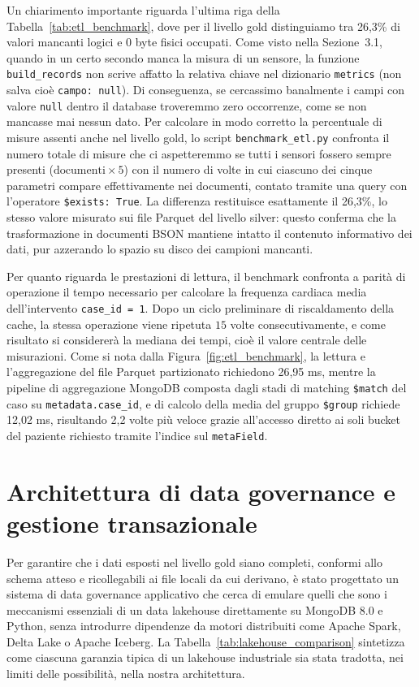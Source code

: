 Un chiarimento importante riguarda l'ultima riga della Tabella~\ref{tab:etl_benchmark}, dove per il livello gold distinguiamo tra 26,3\% di valori mancanti logici e 0 byte fisici occupati. Come visto nella Sezione~3.1, quando in un certo secondo manca la misura di un sensore, la funzione \texttt{build\_records} non scrive affatto la relativa chiave nel dizionario \texttt{metrics} (non salva cio\`e \texttt{campo: null}). Di conseguenza, se cercassimo banalmente i campi con valore \texttt{null} dentro il database troveremmo zero occorrenze, come se non mancasse mai nessun dato. Per calcolare in modo corretto la percentuale di misure assenti anche nel livello gold, lo script \texttt{benchmark\_etl.py} confronta il numero totale di misure che ci aspetteremmo se tutti i sensori fossero sempre presenti ($\text{documenti} \times 5$) con il numero di volte in cui ciascuno dei cinque parametri compare effettivamente nei documenti, contato tramite una query con l'operatore \texttt{\$exists: True}. La differenza restituisce esattamente il 26,3\%, lo stesso valore misurato sui file Parquet del livello silver: questo conferma che la trasformazione in documenti BSON mantiene intatto il contenuto informativo dei dati, pur azzerando lo spazio su disco dei campioni mancanti.

Per quanto riguarda le prestazioni di lettura, il benchmark confronta a parit\`a di operazione il tempo necessario per calcolare la frequenza cardiaca media dell'intervento \texttt{case\_id = 1}. Dopo un ciclo preliminare di riscaldamento della cache, la stessa operazione viene ripetuta $15$ volte consecutivamente, e come risultato si considerer\`a la mediana dei tempi, cio\`e il valore centrale delle misurazioni. Come si nota dalla Figura~\ref{fig:etl_benchmark}, la lettura e l'aggregazione del file Parquet partizionato richiedono 26,95 ms, mentre la pipeline di aggregazione MongoDB composta dagli stadi di matching \texttt{\$match} del caso su \texttt{metadata.case\_id}, e di calcolo della media del gruppo \texttt{\$group} richiede 12,02 ms, risultando 2,2 volte pi\`u veloce grazie all'accesso diretto ai soli bucket del paziente richiesto tramite l'indice sul \texttt{metaField}.

\section{Architettura di data governance e gestione transazionale}
Per garantire che i dati esposti nel livello gold siano completi, conformi allo schema atteso e ricollegabili ai file locali da cui derivano, \`e stato progettato un sistema di data governance applicativo che cerca di emulare quelli che sono i meccanismi essenziali di un data lakehouse direttamente su MongoDB 8.0 e Python, senza introdurre dipendenze da motori distribuiti come Apache Spark, Delta Lake o Apache Iceberg. La Tabella~\ref{tab:lakehouse_comparison} sintetizza come ciascuna garanzia tipica di un lakehouse industriale sia stata tradotta, nei limiti delle possibilit\`a, nella nostra architettura.

